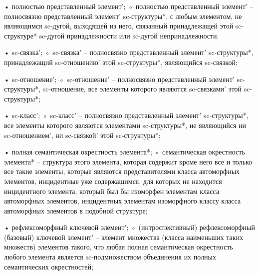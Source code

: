 \begin{SCn}
\end{SCn}
• полностью представленный элемент’;
◦ полностью представленный элемент’ – полносвязно представленный элемент’ sc‑структуры*, с любым элементом, не являющимся sc-дугой, выходящей из него, связанный принадлежащей этой sc-структуре* sc-дугой принадлежности  или sc-дугой непринадлежности.

\begin{SCn}
\end{SCn}
• sc-связка’;
◦ sc-связка’ – полносвязно представленный элемент’ sc-структуры*, принадлежащий sc‑отношению’ этой sc-структуры*, являющийся sc-связкой;

\begin{SCn}
\end{SCn}
• sc-отношение’;
◦ sc-отношение’ – полносвязно представленный элемент’ sc-структуры*, sc-отношение, все элементы которого являются sc-связками’ этой sc-структуры*;

\begin{SCn}
\end{SCn}
• sc-класс’;
◦ sc-класс’ – полносвязно представленный элемент’ sc-структуры*, все элементы которого являются элементами sc‑структуры*, не являющийся ни sc-отношением’, ни sc-связкой’ этой sc‑структуры*;

\begin{SCn}
\end{SCn}
• полная семантическая окрестность элемента*;
◦ семантическая окрестность элемента* – структура этого элемента, которая содержит кроме него все и только все такие элементы, которые являются представителями класса  автоморфных элементов, инцидентные уже содержащимся, для которых не находится инцидентного элемента, который был бы изоморфен элементам класса автоморфных элементов, инцидентных элементам изоморфного классу  класса автоморфных элементов в подобной структуре;

\begin{SCn}
\end{SCn}
• рефлексоморфный ключевой элемент’;
◦ (интроспективный) рефлексоморфный (базовый) ключевой элемент’ – элемент множества (класса наименьших таких множеств) элементов такого, что любая полная семантическая окрестность любого элемента является sc-подмножеством объединения их полных семантических окрестностей;

